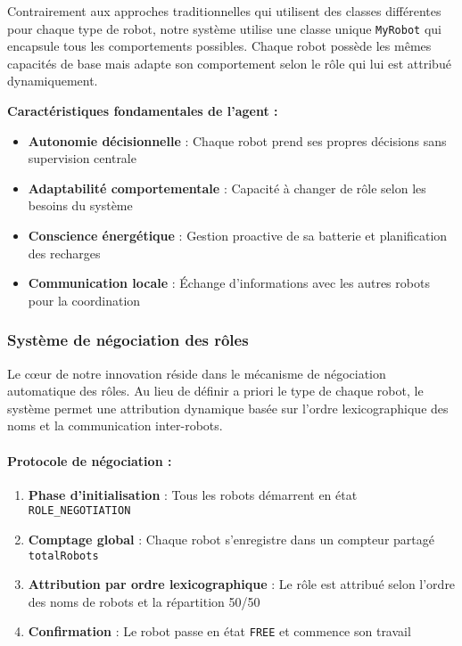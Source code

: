 \documentclass[12pt,a4paper]{article}
\newcommand{\code}[1]{\texttt{#1}}
\begin{document}
Contrairement aux approches traditionnelles qui utilisent des classes différentes pour chaque type de robot, notre système utilise une classe unique \code{MyRobot} qui encapsule tous les comportements possibles. Chaque robot possède les mêmes capacités de base mais adapte son comportement selon le rôle qui lui est attribué dynamiquement.

\textbf{Caractéristiques fondamentales de l'agent :}
\begin{itemize}
    \item \textbf{Autonomie décisionnelle} : Chaque robot prend ses propres décisions sans supervision centrale
    \item \textbf{Adaptabilité comportementale} : Capacité à changer de rôle selon les besoins du système
    \item \textbf{Conscience énergétique} : Gestion proactive de sa batterie et planification des recharges
    \item \textbf{Communication locale} : Échange d'informations avec les autres robots pour la coordination
\end{itemize}

\subsubsection{Système de négociation des rôles}

Le cœur de notre innovation réside dans le mécanisme de négociation automatique des rôles. Au lieu de définir a priori le type de chaque robot, le système permet une attribution dynamique basée sur l'ordre lexicographique des noms et la communication inter-robots.

\paragraph{Protocole de négociation :}

\begin{enumerate}
    \item \textbf{Phase d'initialisation} : Tous les robots démarrent en état \code{ROLE\_NEGOTIATION}
    \item \textbf{Comptage global} : Chaque robot s'enregistre dans un compteur partagé \code{totalRobots}
    \item \textbf{Attribution par ordre lexicographique} : Le rôle est attribué selon l'ordre des noms de robots et la répartition 50/50
    \item \textbf{Confirmation} : Le robot passe en état \code{FREE} et commence son travail
\end{enumerate}
\end{document}
